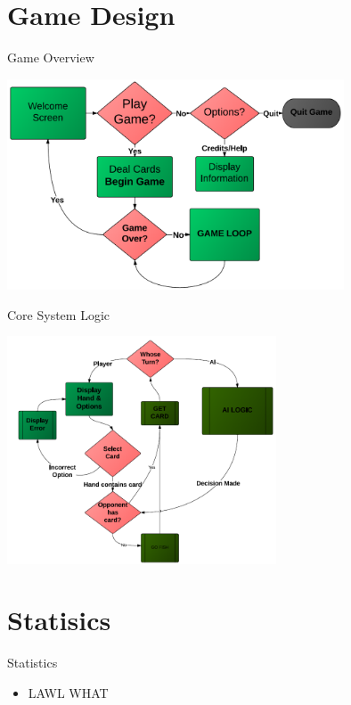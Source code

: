 \documentclass[compress, blue]{beamer}
\begin{document}
\section{Game Design}

\begin{frame}{Game Overview}
\begin{center}
\includegraphics[width=10cm]{Overview.PNG}
\end{center}
\end{frame}

\begin{frame}{Core System Logic}
\begin{center}
\includegraphics[width=8cm]{CoreLogic.PNG}
\end{center}
\end{frame}

\section{Statisics}

\begin{frame}{Statistics}
\begin{itemize}
	\item LAWL WHAT
\end{itemize}
\end{frame}
\end{document}
